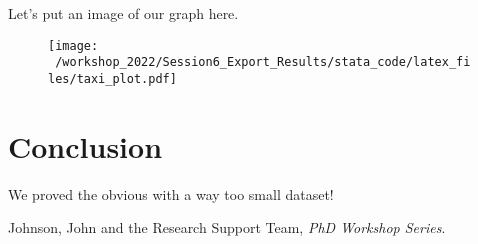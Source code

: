 \documentclass[11pt]{article}
\begin{document}
Let's put an image of our graph here.  
\begin{figure}[!htbp]
\centering
\texttt{[image: ~/workshop\_2022/Session6\_Export\_Results/stata\_code/latex\_files/taxi\_plot.pdf]}
\end{figure}

\section*{Conclusion}

We proved the obvious with a way too small dataset!

\begin{thebibliography}{9}

Johnson, John and the Research Support Team, \emph{PhD Workshop Series}. 

\end{thebibliography}
\end{document}
